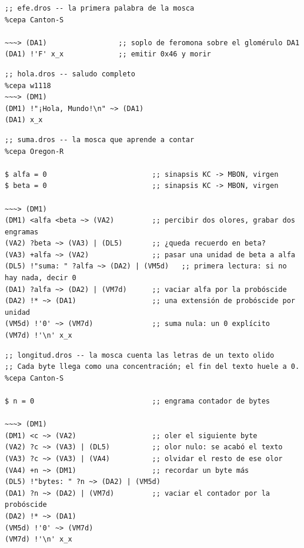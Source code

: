 \documentclass[11pt,a4paper]{article}
\theoremstyle{plain}
\theoremstyle{definition}
\theoremstyle{remark}
\begin{document}
\begin{lstlisting}[style=dros,caption={\texttt{efe.dros}: emisión del carácter F.},label={lst:efe}]
;; efe.dros -- la primera palabra de la mosca
%cepa Canton-S

~~~> (DA1)                 ;; soplo de feromona sobre el glomérulo DA1
(DA1) !'F' x_x             ;; emitir 0x46 y morir
\end{lstlisting}

\begin{lstlisting}[style=dros,caption={\texttt{hola.dros}: saludo en UTF-8 mediante azúcar de cadena.},label={lst:hola}]
;; hola.dros -- saludo completo
%cepa w1118
~~~> (DM1)
(DM1) !"¡Hola, Mundo!\n" ~> (DA1)
(DA1) x_x
\end{lstlisting}

\begin{lstlisting}[style=dros,caption={\texttt{suma.dros}: suma por transferencia sináptica.},label={lst:suma}]
;; suma.dros -- la mosca que aprende a contar
%cepa Oregon-R

$ alfa = 0                         ;; sinapsis KC -> MBON, virgen
$ beta = 0                         ;; sinapsis KC -> MBON, virgen

~~~> (DM1)
(DM1) <alfa <beta ~> (VA2)         ;; percibir dos olores, grabar dos engramas
(VA2) ?beta ~> (VA3) | (DL5)       ;; ¿queda recuerdo en beta?
(VA3) +alfa ~> (VA2)               ;; pasar una unidad de beta a alfa
(DL5) !"suma: " ?alfa ~> (DA2) | (VM5d)   ;; primera lectura: si no hay nada, decir 0
(DA1) ?alfa ~> (DA2) | (VM7d)      ;; vaciar alfa por la probóscide
(DA2) !* ~> (DA1)                  ;; una extensión de probóscide por unidad
(VM5d) !'0' ~> (VM7d)              ;; suma nula: un 0 explícito
(VM7d) !'\n' x_x
\end{lstlisting}

\begin{lstlisting}[style=dros,caption={\texttt{longitud.dros}: longitud en bytes de un texto olido (\texttt{--olor-texto}).},label={lst:longitud}]
;; longitud.dros -- la mosca cuenta las letras de un texto olido
;; Cada byte llega como una concentración; el fin del texto huele a 0.
%cepa Canton-S

$ n = 0                            ;; engrama contador de bytes

~~~> (DM1)
(DM1) <c ~> (VA2)                  ;; oler el siguiente byte
(VA2) ?c ~> (VA3) | (DL5)          ;; olor nulo: se acabó el texto
(VA3) ?c ~> (VA3) | (VA4)          ;; olvidar el resto de ese olor
(VA4) +n ~> (DM1)                  ;; recordar un byte más
(DL5) !"bytes: " ?n ~> (DA2) | (VM5d)
(DA1) ?n ~> (DA2) | (VM7d)         ;; vaciar el contador por la probóscide
(DA2) !* ~> (DA1)
(VM5d) !'0' ~> (VM7d)
(VM7d) !'\n' x_x
\end{lstlisting}
\end{document}
